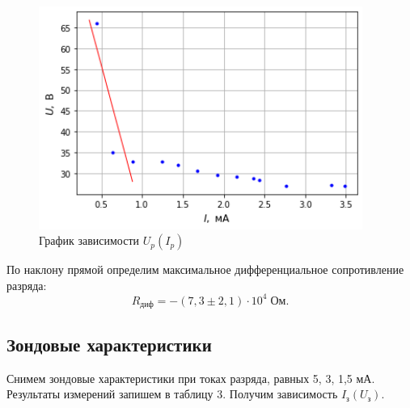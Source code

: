 \documentclass[a4paper]{article}
\theoremstyle{definition}
\theoremstyle{remark}
\begin{document}
    \begin{figure}[h!]
        \centering
        \includegraphics[width = 300pt]{image/graph2.png}
        \caption{График зависимости $U_p(I_p)$}
    \end{figure}

    По наклону прямой определим максимальное дифференциальное сопротивление разряда: $$R_{\text{диф}} = -(7,3 \pm 2,1)\cdot 10^4 \; \text{Ом}.$$

    \subsection{Зондовые характеристики}

    Снимем зондовые характеристики при токах разряда, равных 5, 3, 1,5 мА. Результаты измерений запишем в таблицу 3. Получим зависимость $I_{\text{з}}(U_{\text{з}})$.
\end{document}

